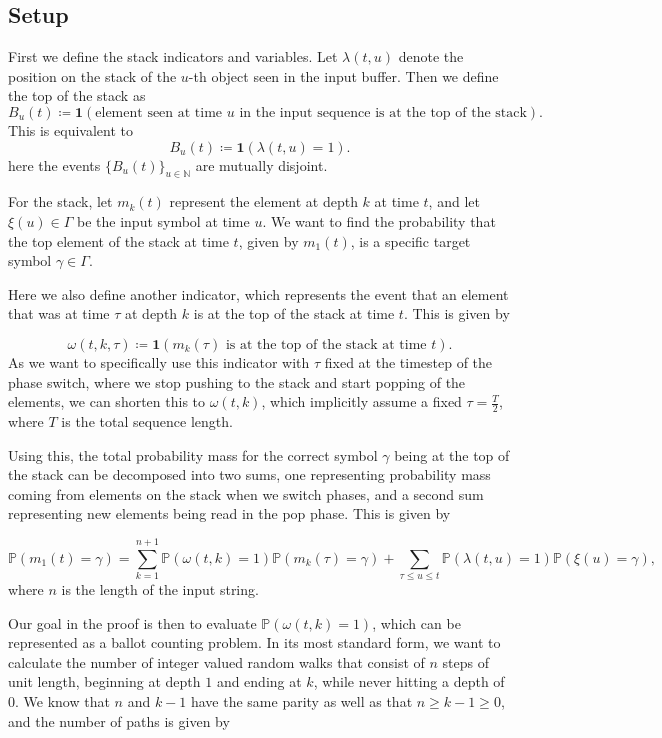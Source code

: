 \documentclass{article}
\begin{document}
\subsection{Setup}

First we define the stack indicators and variables. Let $\lambda(t,u)$ denote the position on the stack of the $u$-th object seen in the input buffer. Then we define the top of the stack as
$$
B_u(t) \coloneqq \mathbf{1}(\text{element seen at time $u$ in the input sequence is at the top of the stack}).
$$
This is equivalent to 
$$
B_u(t) \coloneqq \mathbf{1}(\lambda(t,u) = 1).
$$
here the events $\{B_u(t)\}_{u \in \mathbb{N}}$ are mutually disjoint.

For the stack, let $m_k(t)$ represent the element at depth $k$ at time $t$, and let $\xi(u) \in \Gamma$ be the input symbol at time $u$. We want to find the probability that the top element of the stack at time $t$, given by $m_1(t)$, is a specific target symbol $\gamma \in \Gamma$.

Here we also define another indicator, which represents the event that an element that was at time $\tau$ at depth $k$ is at the top of the stack at time $t$. This is given by

$$
\omega(t,k,\tau) \coloneqq \mathbf{1}(m_k(\tau) \text{ is at the top of the stack at time } t).
$$
As we want to specifically use this indicator with $\tau$ fixed at the timestep of the phase switch, where we stop pushing to the stack and start popping of the elements, we can shorten this to $\omega(t,k)$, which implicitly assume a fixed $\tau = \frac{T}{2}$, where $T$ is the total sequence length. 

Using this, the total probability mass for the correct symbol $\gamma$ being at the top of the stack can be decomposed into two sums, one representing probability mass coming from elements on the stack when we switch phases, and a second sum representing new elements being read in the pop phase. This is given by

$$
\mathbb{P}(m_1(t) = \gamma) = \sum_{k=1}^{n+1}\mathbb{P}(\omega(t,k) = 1)\mathbb{P}(m_k(\tau)=\gamma) + \sum_{\tau \leq u \leq t}\mathbb{P}(\lambda(t,u) = 1)\mathbb{P}(\xi(u) = \gamma),
$$
where $n$ is the length of the input string.

Our goal in the proof is then to evaluate $\mathbb{P}(\omega(t,k) = 1)$, which can be represented as a ballot counting problem. In its most standard form, we want to calculate the number of integer valued random walks that consist of $n$ steps of unit length, beginning at depth $1$ and ending at $k$, while never hitting a depth of $0$. We know that $n$ and $k-1$ have the same parity as well as that $n \geq k-1 \geq 0$, and the number of paths is given by
\end{document}
